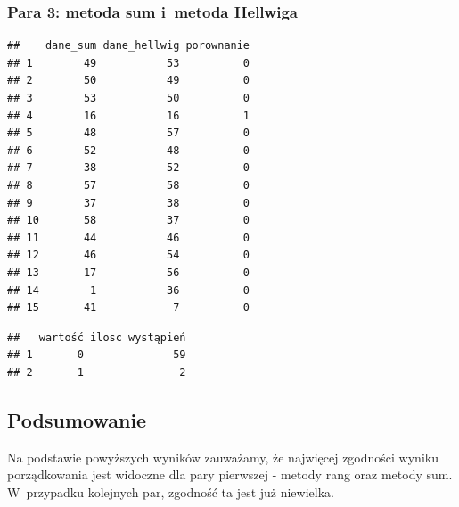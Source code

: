 \documentclass[12pt,a4paper]{report}
\begin{document}
{\subsubsection{Para 3: metoda sum i~metoda
Hellwiga}%
\begin{Shaded}
\begin{Highlighting}[]
\NormalTok{(}\NormalTok{,}\NormalTok{)}
\NormalTok{:}
\NormalTok{\{}
  \NormalTok{\{}
  \NormalTok{\}}
\NormalTok{\}}
\NormalTok{)}
\end{Highlighting}
\end{Shaded}
\begin{verbatim}
##    dane_sum dane_hellwig porownanie
## 1        49           53          0
## 2        50           49          0
## 3        53           50          0
## 4        16           16          1
## 5        48           57          0
## 6        52           48          0
## 7        38           52          0
## 8        57           58          0
## 9        37           38          0
## 10       58           37          0
## 11       44           46          0
## 12       46           54          0
## 13       17           56          0
## 14        1           36          0
## 15       41            7          0
\end{verbatim}
\begin{Shaded}
\begin{Highlighting}[]
\NormalTok{(}
\NormalTok{(}\NormalTok{,}\NormalTok{)}
\end{Highlighting}
\end{Shaded}
\begin{verbatim}
##   wartość ilosc wystąpień
## 1       0              59
## 2       1               2
\end{verbatim}
\subsection{Podsumowanie}\label{podsumowanie}
Na podstawie powyższych wyników zauważamy, że najwięcej zgodności wyniku
porządkowania jest widoczne dla pary pierwszej - metody rang oraz metody
sum. W~przypadku kolejnych par, zgodność ta jest już niewielka.
}
\end{document}
